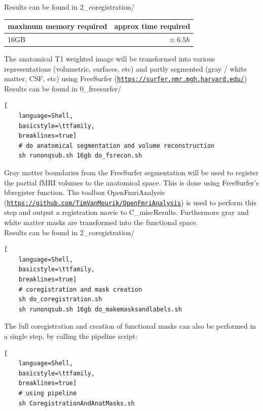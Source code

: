 \documentclass[12pt,a4paper]{scrartcl}
\begin{document}
\noindent Results can be found in 2\_coregistration/\\
\begin{table}[h]
\begin{tabular}{l | r}
\toprule
maximum memory required & approx time required\\\toprule
16GB & $\approx 6.5h$ \\\bottomrule
\end{tabular}
\end{table}
\FloatBarrier
\noindent The anatomical T1 weighted image will be transformed into various representations (volumetric, surfaces, etc) and partly segmented (gray / white matter, CSF, etc) using FreeSurfer (\href{https://surfer.nmr.mgh.harvard.edu/}{\nolinkurl{https://surfer.nmr.mgh.harvard.edu/}})\\

\noindent Results can be found in 0\_freesurfer/\\
\begin{lstlisting}[
    language=Shell,
    basicstyle=\ttfamily,
    breaklines=true]
    # do anatomical segmentation and volume reconstruction
    sh runonqsub.sh 16gb do_fsrecon.sh
\end{lstlisting}
Gray matter boundaries from the FreeSurfer segmentation will be used to register the partial fMRI volumes to the anatomical space. This is done using FreeSurfer's bbregister function. The toolbox OpenFmriAnalysis (\href{https://github.com/TimVanMourik/OpenFmriAnalysis}{\nolinkurl{https://github.com/TimVanMourik/OpenFmriAnalysis}}) is used to perform this step and output a registration movie to C\_miscResults. Furthermore gray and white matter masks are transformed into the functional space.\\

\noindent Results can be found in 2\_coregistration/\\
\begin{lstlisting}[
    language=Shell,
    basicstyle=\ttfamily,
    breaklines=true]
    # coregistration and mask creation
    sh do_coregistration.sh
    sh runonqsub.sh 16gb do_makemasksandlabels.sh
\end{lstlisting}
The full coregistration and creation of functional masks can also be performed in a single step, by calling the pipeline script:
\begin{lstlisting}[
    language=Shell,
    basicstyle=\ttfamily,
    breaklines=true]
    # using pipeline
    sh CoregistrationAndAnatMasks.sh
\end{lstlisting}
\end{document}
